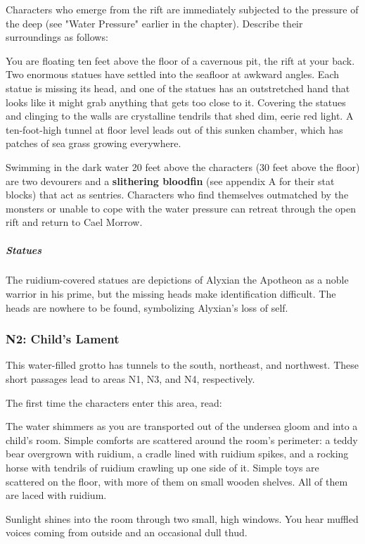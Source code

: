 \documentclass[10pt,a4paper,twoside,bg=print,twocolumn,openany,nodeprecatedcode]{dndbook}
\begin{document}
Characters who emerge from the rift are immediately subjected to the pressure of the deep (see "Water Pressure" earlier in the chapter). Describe their surroundings as follows:

\begin{DndReadAloud}{}
You are floating ten feet above the floor of a cavernous pit, the rift at your back. Two enormous statues have settled into the seafloor at awkward angles. Each statue is missing its head, and one of the statues has an outstretched hand that looks like it might grab anything that gets too close to it. Covering the statues and clinging to the walls are crystalline tendrils that shed dim, eerie red light. A ten-foot-high tunnel at floor level leads out of this sunken chamber, which has patches of sea grass growing everywhere.

\end{DndReadAloud}

Swimming in the dark water 20 feet above the characters (30 feet above the floor) are two devourers and a \textbf{slithering bloodfin} (see appendix A for their stat blocks) that act as sentries. Characters who find themselves outmatched by the monsters or unable to cope with the water pressure can retreat through the open rift and return to Cael Morrow.

\subparagraph{Statues}
The ruidium-covered statues are depictions of Alyxian the Apotheon as a noble warrior in his prime, but the missing heads make identification difficult. The heads are nowhere to be found, symbolizing Alyxian's loss of self.

\subsubsection{N2: Child's Lament}
This water-filled grotto has tunnels to the south, northeast, and northwest. These short passages lead to areas N1, N3, and N4, respectively.

The first time the characters enter this area, read:

\begin{DndReadAloud}{}
The water shimmers as you are transported out of the undersea gloom and into a child's room. Simple comforts are scattered around the room's perimeter: a teddy bear overgrown with ruidium, a cradle lined with ruidium spikes, and a rocking horse with tendrils of ruidium crawling up one side of it. Simple toys are scattered on the floor, with more of them on small wooden shelves. All of them are laced with ruidium.

Sunlight shines into the room through two small, high windows. You hear muffled voices coming from outside and an occasional dull thud.

\end{DndReadAloud}
\end{document}
